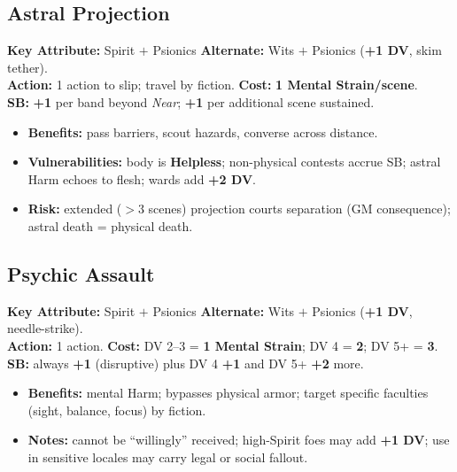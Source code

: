 \documentclass[11pt,twoside]{article}
\begin{document}
\subsection{Astral Projection}
\textbf{Key Attribute:} Spirit $+$ Psionics \quad
\textbf{Alternate:} Wits $+$ Psionics (\textbf{+1 DV}, skim tether). \\
\textbf{Action:} 1 action to slip; travel by fiction. \quad
\textbf{Cost:} \textbf{1 Mental Strain/scene}. \\
\textbf{SB:} \textbf{+1} per band beyond \textit{Near}; \textbf{+1} per additional scene sustained.
\begin{itemize}[leftmargin=*]
  \item \textbf{Benefits:} pass barriers, scout hazards, converse across distance.
  \item \textbf{Vulnerabilities:} body is \textbf{Helpless}; non-physical contests accrue SB; astral Harm echoes to flesh; wards add \textbf{+2 DV}.
  \item \textbf{Risk:} extended ($>3$ scenes) projection courts separation (GM consequence); astral death = physical death.
\end{itemize}


\subsection{Psychic Assault}
\textbf{Key Attribute:} Spirit $+$ Psionics \quad
\textbf{Alternate:} Wits $+$ Psionics (\textbf{+1 DV}, needle-strike). \\
\textbf{Action:} 1 action. \quad
\textbf{Cost:} DV 2--3 = \textbf{1 Mental Strain}; DV 4 = \textbf{2}; DV 5+ = \textbf{3}. \\
\textbf{SB:} always \textbf{+1} (disruptive) plus DV 4 \textbf{+1} and DV 5+ \textbf{+2} more.
\begin{itemize}[leftmargin=*]
  \item \textbf{Benefits:} mental Harm; bypasses physical armor; target specific faculties (sight, balance, focus) by fiction.
  \item \textbf{Notes:} cannot be ``willingly'' received; high-Spirit foes may add \textbf{+1 DV}; use in sensitive locales may carry legal or social fallout.
\end{itemize}

\end{document}
